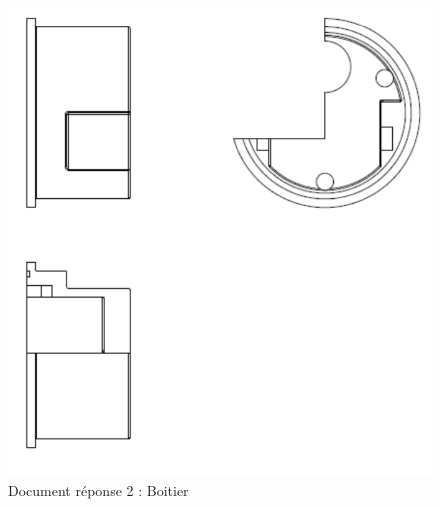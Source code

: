 \begin{figure}[!h]
 \includegraphics[width=0.9\linewidth]{img/dessin2.png}
 \caption{Document réponse 2 : Boitier}
 \end{figure}

\newpage

